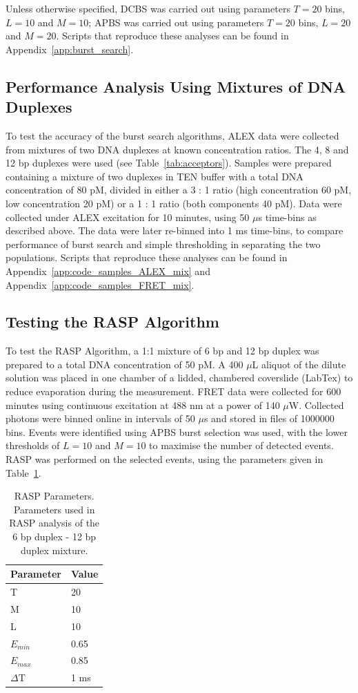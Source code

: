 Unless otherwise specified, DCBS was carried out using parameters $T = 20$ bins, $L = 10$ and $M = 10$; APBS was carried out using parameters $T = 20$ bins, $L = 20$ and $M = 20$. Scripts that reproduce these analyses can be found in Appendix~\ref{app:burst_search}.

\subsection{Performance Analysis Using Mixtures of DNA Duplexes}
To test the accuracy of the burst search algorithms, ALEX data were collected from mixtures of two DNA duplexes at known concentration ratios. The 4, 8 and 12 bp duplexes were used (see Table~\ref{tab:acceptors}). Samples were prepared containing a mixture of two duplexes in TEN buffer with a total DNA concentration of 80 pM, divided in either a 3 : 1 ratio (high concentration 60 pM, low concentration 20 pM) or a 1 : 1 ratio (both components 40 pM). Data were collected under ALEX excitation for 10 minutes, using 50 $\mu$s time-bins as described above. The data were later re-binned into 1 ms time-bins, to compare performance of burst search and simple thresholding in separating the two populations. Scripts that reproduce these analyses can be found in Appendix~\ref{app:code_samples_ALEX_mix} and Appendix~\ref{app:code_samples_FRET_mix}.  


\subsection{Testing the RASP Algorithm}
To test the RASP Algorithm, a 1:1 mixture of 6 bp and 12 bp duplex was prepared to a total DNA concentration of 50 pM. A 400 $\mu$L aliquot of the dilute solution was placed in one chamber of a lidded, chambered coverslide (LabTex) to reduce evaporation during the measurement. FRET data were collected for 600 minutes using continuous excitation at 488 nm at a power of 140 $\mu$W. Collected photons were binned online in intervals of 50 $\mu$s and stored in files of 1000000 bins. Events were identified using APBS burst selection was used, with the lower thresholds of $L = 10$ and $M = 10$ to maximise the number of detected events. RASP was performed on the selected events, using the parameters given in Table~\ref{tab:RASP}. 

\begin{table}[!ht]
\caption{
{RASP Parameters}. Parameters used in RASP analysis of the 6 bp duplex - 12 bp duplex mixture.}
\begin{tabular}{|l|l|}
\hline
Parameter & Value \\
\hline
T & 20 \\
M & 10 \\
L & 10 \\
$E_{min}$ & 0.65 \\
$E_{max}$ & 0.85 \\
$\Delta$T & 1 ms \\
\hline
\end{tabular}

\label{tab:RASP}
\end{table}

